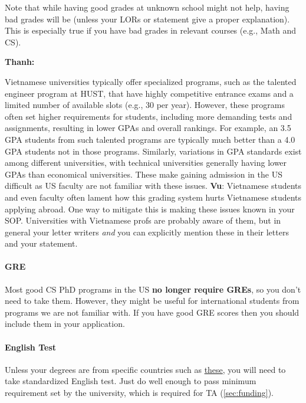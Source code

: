 \documentclass[oneside,11pt]{memoir}
\newenvironment{commentbox}[1][]{
  \small
  \begin{mybox}
    {\small \textbf{#1}}
  }{
  \end{mybox}
}
\newcommand{\red}[1]{{\color{red}{#1}}}
\begin{document}
Note that while having good grades at unknown school might not help,
having bad grades will be \red{red flag} (unless your LORs or
statement give a proper explanation). This is especially true if you
have bad grades in relevant courses (e.g., Math and CS).

\begin{commentbox}[Thanh:]
  Vietnamese universities typically offer specialized programs, such as the talented engineer program at HUST, that have highly competitive entrance exams and a limited number of available slots (e.g., 30 per year). However, these programs often set higher requirements for students, including more demanding tests and assignments, resulting in lower GPAs and overall rankings. For example, an 3.5 GPA students from such talented programs are typically much better than a 4.0 GPA students not in those programs.  Similarly, variations in GPA standards exist among different universities, with technical universities generally having lower GPAs than economical universities. These make gaining admission in the US difficult as US faculty are not familiar with these issues.
  \tcblower
  \textbf{Vu}: Vietnamese students and even faculty often lament how this grading system hurts Vietnamese students applying abroad. One way to mitigate this is making these issues known in your SOP.  Universities with Vietnamese profs are probably aware of them, but in general your letter writers \emph{and} you can explicitly mention these in their letters and your statement.
\end{commentbox}

\paragraph{GRE} Most good CS PhD programs in the US \textbf{no longer require GREs}, so you don't need to take them. However, they might be useful for international students from programs we are not familiar with.  If you have good GRE scores then you should include them in your application.

\paragraph{English Test} Unless your degrees are from specific countries such as \href{https://github.com/dynaroars/dynaroars.github.io/wiki/About-GMU#standard-tests-waiver-eligible-countries}{these}, you will need to
take standardized English test. Just do well enough to pass minimum requirement set by the university, which is required for TA (\autoref{sec:funding}).
\end{document}
